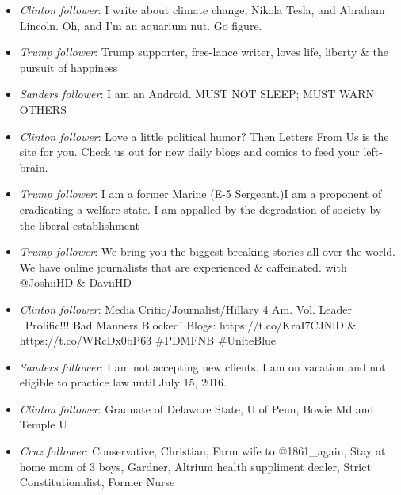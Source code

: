 \begin{itemize}  

\item\emph{Clinton follower}: I write about climate change, Nikola Tesla, and Abraham Lincoln. Oh, and I'm an aquarium nut. Go figure.

\item\emph{Trump follower}: Trump supporter, free-lance writer, loves life, liberty \& the pursuit of happiness

\item \emph{Sanders follower}: I am an Android. MUST NOT SLEEP; MUST WARN OTHERS

\item \emph{Clinton follower}: Love a little political humor? Then Letters From Us is the site for you. Check us out for new daily blogs and comics to feed your left-brain.

\item \emph{Trump follower}: I am a former Marine (E-5 Sergeant.)I am a proponent of eradicating a welfare state.  I am appalled by the degradation of society by the liberal establishment
 
\item \emph{Trump follower}: We bring you the biggest breaking stories all over the world. We have online journalists that are experienced \& caffeinated. with @JoshiiHD \& DaviiHD
 
\item \emph{Clinton follower}: Media Critic/Journalist/Hillary 4 Am. Vol. Leader ~Prolific!!! Bad Manners Blocked! Blogs: https://t.co/KraI7CJNlD \& https://t.co/WRcDx0bP63 \#PDMFNB \#UniteBlue
 
\item \emph{Sanders follower}: I am not accepting new clients. I am on vacation and not eligible to practice law until July 15, 2016.

\item \emph{Clinton follower}: Graduate of Delaware State, U of Penn, Bowie Md and Temple U

\item \emph{Cruz follower}: Conservative, Christian, Farm wife to @1861\_again, Stay at home mom of 3 boys, Gardner, Altrium health suppliment dealer, Strict Constitutionalist, Former Nurse


\end{itemize}



 

